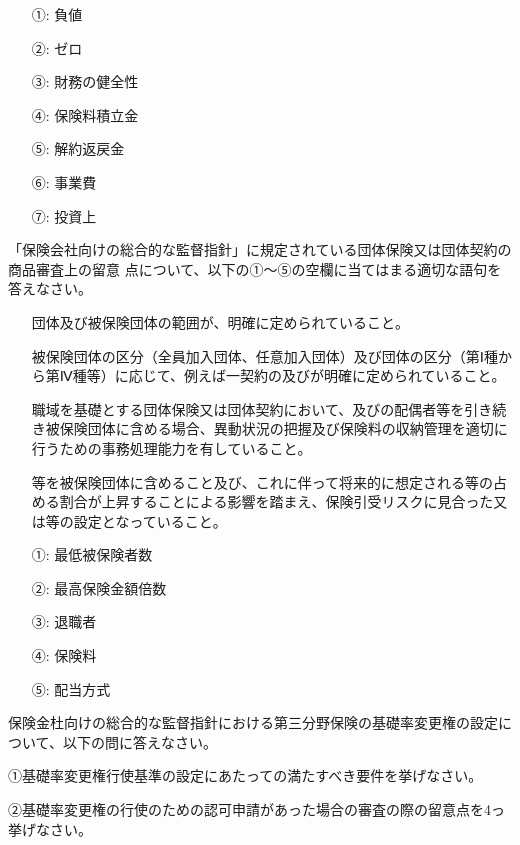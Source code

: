 \documentclass[report,gutter=10mm,fore-edge=10mm,uplatex,dvipdfmx]{jlreq}
\begin{document}
\answer{}
\begin{itemize}
\item[ ①:]  負値
\item[ ②:]  ゼロ
\item[ ③:]  財務の健全性
\item[ ④:]  保険料積立金
\item[ ⑤:]  解約返戻金
\item[ ⑥:]  事業費
\item[ ⑦:]  投資上
\end{itemize}

「保険会社向けの総合的な監督指針」に規定されている団体保険又は団体契約の商品審査上の留意
点について、以下の①～⑤の空欄に当てはまる適切な語句を答えなさい。

\begin{itemize}
\item[] 団体及び被保険団体の範囲が、明確に定められていること。
\item[] 被保険団体の区分（全員加入団体、任意加入団体）及び団体の区分（第Ⅰ種から第Ⅳ種等）に応じて、例えば一契約の及びが明確に定められていること。
\item[] 職域を基礎とする団体保険又は団体契約において、及びの配偶者等を引き続き被保険団体に含める場合、異動状況の把握及び保険料の収納管理を適切に行うための事務処理能力を有していること。
\item[]  等を被保険団体に含めること及び、これに伴って将来的に想定される等の占める割合が上昇することによる影響を踏まえ、保険引受リスクに見合った又は等の設定となっていること。
\end{itemize}

\answer{}
\begin{itemize}
\item[ ①: ] 最低被保険者数
\item[ ②: ] 最高保険金額倍数
\item[ ③: ] 退職者
\item[ ④: ] 保険料
\item[ ⑤: ] 配当方式
\end{itemize}

保険金杜向けの総合的な監督指針における第三分野保険の基礎率変更権の設定について、以下の問に答えなさい。

①基礎率変更権行使基準の設定にあたっての満たすべき要件を挙げなさい。

②基礎率変更権の行使のための認可申請があった場合の審査の際の留意点を4っ挙げなさい。
\end{document}
